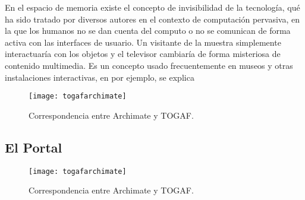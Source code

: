 En el espacio de memoria existe el concepto de invisibilidad de la tecnología\cite{RN13,weiser1991computer,RN23,RN14}, qué ha sido tratado por diversos autores en el contexto de computación pervasiva, en la que los humanos no se dan cuenta del computo o no se comunican de forma activa con las interfaces de usuario. Un visitante de la muestra simplemente interactuaría con los objetos y el televisor cambiaría de forma misteriosa de contenido multimedia. Es un concepto usado frecuentemente en museos y otras instalaciones interactivas, en \cite{RN31} por ejemplo, se explica  

\begin{figure}[h]\label{togafarchimate}
\centering
\texttt{[image: togafarchimate]}
\caption{Correspondencia entre Archimate y TOGAF.}
\end{figure}

\subsection{El Portal}

\begin{figure}[h]\label{togafarchimate}
\centering
\texttt{[image: togafarchimate]}
\caption{Correspondencia entre Archimate y TOGAF.}
\end{figure}